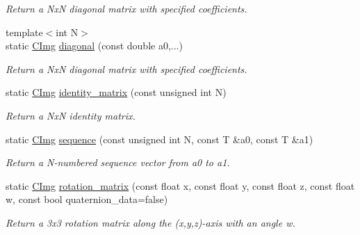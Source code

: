 \begin{DoxyCompactItemize}
\begin{DoxyCompactList}\small\item\em Return a Nx\-N diagonal matrix with specified coefficients. \end{DoxyCompactList}\item 
\hypertarget{structcimg__library_1_1_c_img_a90cd0fbb932ba2bf67b7eb8c796683ed}{{\footnotesize template$<$int N$>$ }\\static \hyperlink{structcimg__library_1_1_c_img}{C\-Img} \hyperlink{structcimg__library_1_1_c_img_a90cd0fbb932ba2bf67b7eb8c796683ed}{diagonal} (const double a0,...)}\label{structcimg__library_1_1_c_img_a90cd0fbb932ba2bf67b7eb8c796683ed}

\begin{DoxyCompactList}\small\item\em Return a Nx\-N diagonal matrix with specified coefficients. \end{DoxyCompactList}\item 
\hypertarget{structcimg__library_1_1_c_img_ae413eaa44b87492f8c89ddb7c38603aa}{static \hyperlink{structcimg__library_1_1_c_img}{C\-Img} \hyperlink{structcimg__library_1_1_c_img_ae413eaa44b87492f8c89ddb7c38603aa}{identity\-\_\-matrix} (const unsigned int N)}\label{structcimg__library_1_1_c_img_ae413eaa44b87492f8c89ddb7c38603aa}

\begin{DoxyCompactList}\small\item\em Return a Nx\-N identity matrix. \end{DoxyCompactList}\item 
\hypertarget{structcimg__library_1_1_c_img_a9fcc2fb6dc5a7629dc2558adceb474b3}{static \hyperlink{structcimg__library_1_1_c_img}{C\-Img} \hyperlink{structcimg__library_1_1_c_img_a9fcc2fb6dc5a7629dc2558adceb474b3}{sequence} (const unsigned int N, const T \&a0, const T \&a1)}\label{structcimg__library_1_1_c_img_a9fcc2fb6dc5a7629dc2558adceb474b3}

\begin{DoxyCompactList}\small\item\em Return a N-\/numbered sequence vector from {\ttfamily a0} to {\ttfamily a1}. \end{DoxyCompactList}\item 
\hypertarget{structcimg__library_1_1_c_img_a70c96fae54ed1d36114917d5fe1072bf}{static \hyperlink{structcimg__library_1_1_c_img}{C\-Img} \hyperlink{structcimg__library_1_1_c_img_a70c96fae54ed1d36114917d5fe1072bf}{rotation\-\_\-matrix} (const float x, const float y, const float z, const float w, const bool quaternion\-\_\-data=false)}\label{structcimg__library_1_1_c_img_a70c96fae54ed1d36114917d5fe1072bf}

\begin{DoxyCompactList}\small\item\em Return a 3x3 rotation matrix along the (x,y,z)-\/axis with an angle w. \end{DoxyCompactList}\end{DoxyCompactItemize}
